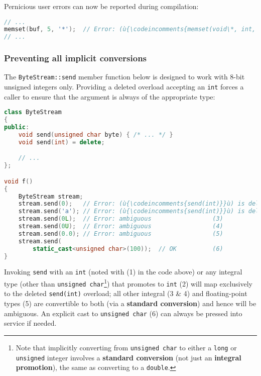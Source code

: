 \noindent Pernicious user errors can now be reported during compilation:

\begin{lstlisting}[language=C++]
// ...
memset(buf, 5, '*');  // Error: (ù{\codeincomments{memset(void\*, int, char)}}ù) is deleted.
// ...
\end{lstlisting}
    

\subsubsection[Preventing all implicit conversions]{Preventing all implicit conversions}\label{preventing-all-implicit-conversions}

The \texttt{ByteStream::send} member function below is designed to work
with 8-bit unsigned integers only. Providing a deleted overload
accepting an \texttt{int} forces a caller to ensure that the argument is
always of the appropriate type:

\begin{lstlisting}[language=C++]
class ByteStream
{
public:
    void send(unsigned char byte) { /* ... */ }
    void send(int) = delete;

    // ...
};

void f()
{
    ByteStream stream;
    stream.send(0);   // Error: (ù{\codeincomments{send(int)}}ù) is deleted.     (1)
    stream.send('a'); // Error: (ù{\codeincomments{send(int)}}ù) is deleted.     (2)
    stream.send(0L);  // Error: ambiguous                 (3)
    stream.send(0U);  // Error: ambiguous                 (4)
    stream.send(0.0); // Error: ambiguous                 (5)
    stream.send(
        static_cast<unsigned char>(100));  // OK          (6)
}
\end{lstlisting}
    
\noindent Invoking \texttt{send} with an \texttt{int} (noted with (1) in the code above) or any integral type
(other than \texttt{unsigned}~\texttt{char}{\cprotect\footnote{Note that
implicitly converting from \texttt{unsigned}~\texttt{char} to either a
\texttt{long} or \texttt{unsigned} integer involves a \textbf{standard
conversion} (not just an \textbf{integral promotion}), the same as
  converting to a \texttt{double}.}}) that promotes to \texttt{int} (2)
will map exclusively to the deleted \texttt{send(int)} overload; all
other integral (3 \& 4) and floating-point types (5) are convertible to
both (via a \textbf{standard conversion}) and hence will be ambiguous.
An explicit cast to \texttt{unsigned}~\texttt{char} (6) can always be
pressed into service if needed.

